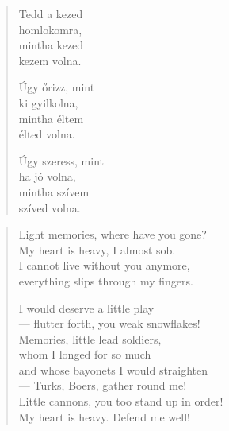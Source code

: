 \documentclass[11pt]{extbook}
\newcommand*{\centeredornament}{\centerline{\pgfornament[width=6cm]{88}}}
\begin{document}
\newpage

\vspace*{-15mm}
\centeredornament



\begin{verse}
  Tedd a kezed \\
  homlokomra, \\
  mintha kezed \\
  kezem volna.

  Úgy őrizz, mint \\
  ki gyilkolna, \\
  mintha éltem \\
  élted volna.

  Úgy szeress, mint \\
  ha jó volna, \\
  mintha szívem \\
  szíved volna.
\end{verse}

\newpage


\vspace*{-15mm}
\centeredornament




\begin{verse}
  Light memories, where have you gone? \\
  My heart is heavy, I almost sob. \\
  I cannot live without you anymore, \\
  everything slips through my fingers.

  I would deserve a little play \\
  --- flutter forth, you weak snowflakes! \\
  Memories, little lead soldiers, \\
  whom I longed for so much \\
  and whose bayonets I would straighten \\
  --- Turks, Boers, gather round me! \\
  Little cannons, you too stand up in order! \\
  My heart is heavy. Defend me well!
\end{verse}
\end{document}
